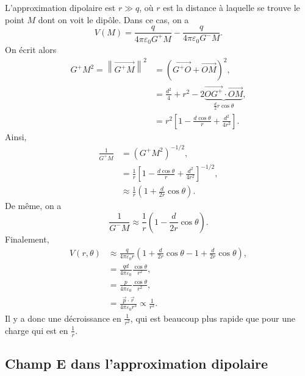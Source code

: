 L'approximation dipolaire est $r\gg q$, où $r$ est la distance à laquelle se trouve le point $M$ dont on voit le dipôle. Dans ce cas, on a 
\begin{equation}
    V(M)=\frac{q}{4\pi\varepsilon_{0}G^{+}M}-\frac{q}{4\pi\varepsilon_{0}G^{-}M}.
\end{equation}
On écrit alors
\begin{align}
    G^{+}M^{2}=\left\lVert \overrightarrow{G^{+}M}\right\rVert^{2}
    &=\left(\overrightarrow{G^{+}O}+\overrightarrow{OM}\right)^{2},\\
    &=\frac{d^{2}}{4}+r^{2}-2\underbrace{\overrightarrow{OG^{+}}\cdot\overrightarrow{OM}}_{\frac{d}{2}r\cos\theta},\\
    &=r^{2}\left[
        1-\frac{d\cos\theta}{r}+\frac{d^{2}}{4r^{2}}
    \right].
\end{align}
Ainsi,
\begin{align}
    \frac{1}{G^{+}M}
    &=(G^{+}M^{2})^{-1/2},\\
    &=\frac{1}{r}\left[1-\frac{d\cos\theta}{r}+\frac{d^{2}}{4r^{2}}\right]^{-1/2},\\
    &\approx\frac{1}{r}\left(1+\frac{d}{2r}\cos\theta\right).
\end{align}
De même, on a 
\begin{equation}
    \frac{1}{G^{-}M}\approx\frac{1}{r}\left(1-\frac{d}{2r}\cos\theta\right).
\end{equation}
Finalement,
\begin{align}
    V(r,\theta)
    &\approx\frac{q}{4\pi\varepsilon_0 r}\left(1+\frac{d}{2r}\cos\theta-1+\frac{d}{2r}\cos\theta\right),\\
    &=\frac{qd}{4\pi\varepsilon_0}\frac{\cos\theta}{r^{2}},\\
    &=\frac{p}{4\pi\varepsilon_0}\frac{\cos\theta}{r^{2}},\\
    &=\frac{\vec{p}\cdot\vec{r}}{4\pi\varepsilon_0 r^{3}}\propto\frac{1}{r^{2}}.
\end{align}
Il  y a donc une décroissance en $\frac{1}{r^{2}}$, qui est beaucoup plus rapide que pour une charge qui est en $\frac{1}{r}$.

\subsection{Champ E dans l'approximation dipolaire}

